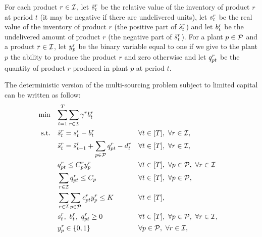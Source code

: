 For each product $r\in\mathcal{I}$, let $\tilde{s}_t^r$ be the relative value of the inventory of product $r$ at period $t$ (\ie it may be negative if there are undelivered units), let $s_t^r$ be the real value of the inventory of product $r$ (\ie the positive part of $\tilde{s}_t^r$) and let $b_t^r$ be the undelivered amount of product $r$ (\ie the negative part of $\tilde{s}_t^r$). For a plant $p\in\mathcal{P}$ and a product $r\in\mathcal{I}$, let $y_p^r$ be the binary variable equal to one if we give to the plant $p$ the ability to produce the product $r$ and zero otherwise and let $q_{pt}^r$ be the quantity of product $r$ produced in plant $p$ at period $t$.

The deterministic version of the multi-sourcing problem subject to limited capital can be written as follow:
\begin{subequations}\label{eq:multi-sourcing - limited capital}
  \begin{align}
    \min\quad & \rlap{$\ds \sum_{t=1}^{\horizon} \sum_{r\in\REF} \backorder^r \backlog_t^r$}
    \label{eq:multi-sourcing - limited capital - objective}
    \\
    \st\quad & \ds \level_t^r = \inventory_t^r - \backlog_t^r && \forall t\in\range{\horizon},\ \forall r\in\REF,
    \label{eq:multi-sourcing - limited capital - inventory}
    \\
    & \ds \level_t^r = \level_{t-1}^r + \sum_{p\in\plants}\quantity_{pt}^r - \demand_t^r && \forall t\in\range{\horizon},\ \forall r\in\REF,
    \label{eq:multi-sourcing - limited capital - dynamic}
    \\
    & \ds \quantity_{pt}^r \le \capacity_p^r \assign_p^r && \forall t\in\range{\horizon},\ \forall p\in\plants,\ \forall r\in\REF
    \label{eq:multi-sourcing - limited capital - big M}
    \\
    & \ds \sum_{r\in\REF}\quantity_{pt}^r \le \capacity_p && \forall t\in\range{\horizon},\ \forall p\in\plants,
    \label{eq:multi-sourcing - limited capital - capacity}
    \\
    & \ds \sum_{r\in\REF} \sum_{p\in\plants}\affect_{pt}^r\assign_p^r \le \capital && \forall t\in\range{\horizon},
    \label{eq:multi-sourcing - limited capital - capital}
    \\
    & \ds \inventory_t^r,\ \backlog_t^r,\ \quantity_{pt}^r \ge 0 && \forall t\in\range{\horizon},\ \forall p\in\plants,\ \forall r\in\REF,
    \label{eq:multi-sourcing - limited capital - nonnegativity}
    \\
    & \ds \assign_p^r \in \crbracket{0,1} && \forall p\in\plants,\ \forall r\in\REF,
    \label{eq:multi-sourcing - limited capital - binary}
  \end{align}
\end{subequations}


